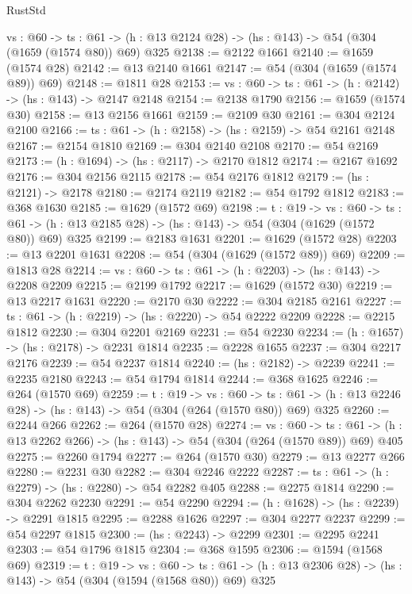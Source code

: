 \begin{lexlean}{RustStd}
\begin{coremodule}
  {vs : @60} ->
  {ts : @61} -> (h : @13 @2124 @28) -> (hs : @143) -> @54 (@304 (@1659 (@1574 @80)) @69) @325
@2138 := @2122 @1661
@2140 := @1659 (@1574 @28)
@2142 := @13 @2140 @1661
@2147 := @54 (@304 (@1659 (@1574 @89)) @69)
@2148 := @1811 @28
@2153 := {vs : @60} -> {ts : @61} -> (h : @2142) -> (hs : @143) -> @2147 @2148
@2154 := @2138 @1790
@2156 := @1659 (@1574 @30)
@2158 := @13 @2156 @1661
@2159 := @2109 @30
@2161 := @304 @2124 @2100
@2166 := {ts : @61} -> (h : @2158) -> (hs : @2159) -> @54 @2161 @2148
@2167 := @2154 @1810
@2169 := @304 @2140 @2108
@2170 := @54 @2169
@2173 := (h : @1694) -> (hs : @2117) -> @2170 @1812
@2174 := @2167 @1692
@2176 := @304 @2156 @2115
@2178 := @54 @2176 @1812
@2179 := (hs : @2121) -> @2178
@2180 := @2174 @2119
@2182 := @54 @1792 @1812
@2183 := @368 @1630
@2185 := @1629 (@1572 @69)
@2198 := {t : @19} ->
  {vs : @60} ->
  {ts : @61} -> (h : @13 @2185 @28) -> (hs : @143) -> @54 (@304 (@1629 (@1572 @80)) @69) @325
@2199 := @2183 @1631
@2201 := @1629 (@1572 @28)
@2203 := @13 @2201 @1631
@2208 := @54 (@304 (@1629 (@1572 @89)) @69)
@2209 := @1813 @28
@2214 := {vs : @60} -> {ts : @61} -> (h : @2203) -> (hs : @143) -> @2208 @2209
@2215 := @2199 @1792
@2217 := @1629 (@1572 @30)
@2219 := @13 @2217 @1631
@2220 := @2170 @30
@2222 := @304 @2185 @2161
@2227 := {ts : @61} -> (h : @2219) -> (hs : @2220) -> @54 @2222 @2209
@2228 := @2215 @1812
@2230 := @304 @2201 @2169
@2231 := @54 @2230
@2234 := (h : @1657) -> (hs : @2178) -> @2231 @1814
@2235 := @2228 @1655
@2237 := @304 @2217 @2176
@2239 := @54 @2237 @1814
@2240 := (hs : @2182) -> @2239
@2241 := @2235 @2180
@2243 := @54 @1794 @1814
@2244 := @368 @1625
@2246 := @264 (@1570 @69)
@2259 := {t : @19} ->
  {vs : @60} ->
  {ts : @61} -> (h : @13 @2246 @28) -> (hs : @143) -> @54 (@304 (@264 (@1570 @80)) @69) @325
@2260 := @2244 @266
@2262 := @264 (@1570 @28)
@2274 := {vs : @60} ->
  {ts : @61} -> (h : @13 @2262 @266) -> (hs : @143) -> @54 (@304 (@264 (@1570 @89)) @69) @405
@2275 := @2260 @1794
@2277 := @264 (@1570 @30)
@2279 := @13 @2277 @266
@2280 := @2231 @30
@2282 := @304 @2246 @2222
@2287 := {ts : @61} -> (h : @2279) -> (hs : @2280) -> @54 @2282 @405
@2288 := @2275 @1814
@2290 := @304 @2262 @2230
@2291 := @54 @2290
@2294 := (h : @1628) -> (hs : @2239) -> @2291 @1815
@2295 := @2288 @1626
@2297 := @304 @2277 @2237
@2299 := @54 @2297 @1815
@2300 := (hs : @2243) -> @2299
@2301 := @2295 @2241
@2303 := @54 @1796 @1815
@2304 := @368 @1595
@2306 := @1594 (@1568 @69)
@2319 := {t : @19} ->
  {vs : @60} ->
  {ts : @61} -> (h : @13 @2306 @28) -> (hs : @143) -> @54 (@304 (@1594 (@1568 @80)) @69) @325

\end{coremodule}
\end{lexlean}
